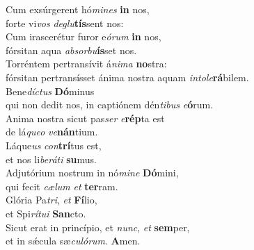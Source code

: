 \evenverse Cum exsúrgerent hó\textit{mi}\textit{nes} \textbf{in} nos,~\*\\
\evenverse forte vi\textit{vos} \textit{de}\textit{glu}\textbf{tís}sent nos:\\
\oddverse Cum irascerétur furor e\textit{ó}\textit{rum} \textbf{in} nos,~\*\\
\oddverse fórsitan aqua \textit{ab}\textit{sor}\textit{bu}\textbf{ís}set nos.\\
\evenverse Torréntem pertransívit á\textit{ni}\textit{ma} \textbf{no}stra:~\*\\
\evenverse fórsitan pertransísset ánima nostra aquam \textit{in}\textit{to}\textit{le}\textbf{rá}bilem.\\
\oddverse Bene\textit{dí}\textit{ctus} \textbf{Dó}minus~\*\\
\oddverse qui non dedit nos, in captiónem dén\textit{ti}\textit{bus} \textit{e}\textbf{ó}rum.\\
\evenverse Anima nostra sicut pas\textit{ser} \textit{e}\textbf{rép}ta est~\*\\
\evenverse de lá\textit{que}\textit{o} \textit{ve}\textbf{nán}tium.\\
\oddverse Láque\textit{us} \textit{con}\textbf{trí}tus est,~\*\\
\oddverse et nos li\textit{be}\textit{rá}\textit{ti} \textbf{su}mus.\\
\evenverse Adjutórium nostrum in nó\textit{mi}\textit{ne} \textbf{Dó}mini,~\*\\
\evenverse qui fecit \textit{cæ}\textit{lum} \textit{et} \textbf{ter}ram.\\
\oddverse Glória Pa\textit{tri}, \textit{et} \textbf{Fí}lio,~\*\\
\oddverse et Spi\textit{rí}\textit{tu}\textit{i} \textbf{San}cto.\\
\evenverse Sicut erat in princípio, et \textit{nunc}, \textit{et} \textbf{sem}per,~\*\\
\evenverse et in sǽcula sæ\textit{cu}\textit{ló}\textit{rum}. \textbf{A}men.\\
